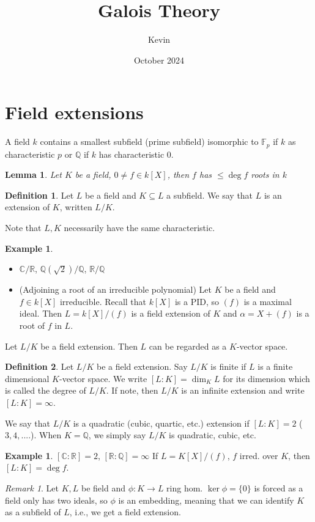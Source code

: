 \documentclass{article}
\title{Galois Theory}
\author{Kevin}
\date{October 2024}
\theoremstyle{definition}
\newtheorem*{defn*}{Definition}
\newtheorem{example}[defn]{Example}
\theoremstyle{remark}
\newtheorem{rem}{Remark}
\theoremstyle{plain}
\newtheorem{lem}[defn]{Lemma}
\newcommand{\QQ}{\mathbb{Q}}
\newcommand{\RR}{\mathbb{R}}
\newcommand{\CC}{\mathbb{C}}
\newcommand{\FF}{\mathbb{F}}
\begin{document}
\maketitle
\section{Field extensions}
A field $k$ contains a smallest subfield (prime subfield) isomorphic to $\FF_p$ if $k$ as characteristic $p$ or $\QQ$ if $k$ has characteristic $0$.
\begin{lem}
    Let $K$ be a field, $0\neq f\in k[X]$, then $f$ has $\le\deg f$ roots in $k$
\end{lem}
\begin{defn*}
Let $L$ be a field and $K\subseteq L$ a subfield. We say that $L$ is an extension of $K$, written $L/K$.
\end{defn*}
Note that $L, K$ necessarily have the same characteristic.
\begin{example}
    \begin{itemize}
        \item $\CC/\RR$, $\QQ(\sqrt{2})/\QQ$, $\RR/\QQ$
        \item (Adjoining a root of an irreducible polynomial) Let $K$ be a field and $f\in k[X]$ irreducible. Recall that $k[X]$ is a PID, so $(f)$ is a maximal ideal. Then $L=k[X]/(f)$ is a field extension of $K$ and $\alpha=X+(f)$ is a root of $f$ in $L$.
    \end{itemize}
\end{example}
Let $L/K$ be a field extension. Then $L$ can be regarded as a $K$-vector space.
\begin{defn*}
    Let $L/K$ be a field extension. Say $L/K$ is finite if $L$ is a finite dimensional $K$-vector space. We write $[L:K]=\dim_KL$ for its dimension which is called the degree of $L/K$. If note, then $L/K$ is an infinite extension and write $[L:K]=\infty$.
\end{defn*}
We say that $L/K$ is a quadratic (cubic, quartic, etc.) extension if $[L:K]=2$ ($3,4,....$). When $K=\QQ$, we simply say $L/K$ is quadratic, cubic, etc.
\begin{example}
    $[\CC:\RR]=2$, $[\RR:\QQ]=\infty$
    If $L=K[X]/(f)$, $f$ irred. over $K$, then $[L:K]=\deg f$.
\end{example}
\begin{rem}
    Let $K,L$ be field and $\phi:K\to L$ ring hom. $\ker\phi=\{0\}$ is forced as a field only has two ideals, so $\phi$ is an embedding, meaning that we can identify $K$ as a subfield of $L$, i.e., we get a field extension.
\end{rem}
\end{document}
